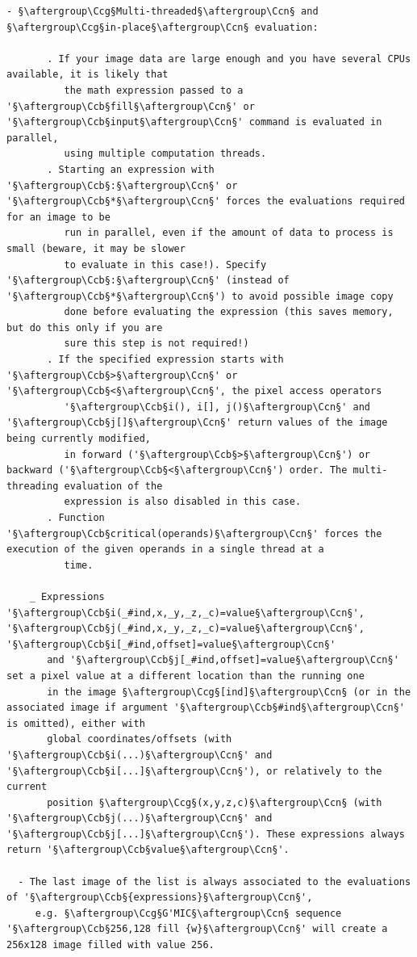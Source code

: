 \documentclass[a4paper,10.5pt,twoside]{book}
\def\Ccb{\color{cb}}
\def\Ccg{\color{cc}}
\def\Ccn{\color{black}}
\begin{document}
\begin{lstlisting}[escapechar=§]
    - §\aftergroup\Ccg§Multi-threaded§\aftergroup\Ccn§ and §\aftergroup\Ccg§in-place§\aftergroup\Ccn§ evaluation: 
 
       . If your image data are large enough and you have several CPUs available, it is likely that 
          the math expression passed to a '§\aftergroup\Ccb§fill§\aftergroup\Ccn§' or '§\aftergroup\Ccb§input§\aftergroup\Ccn§' command is evaluated in parallel, 
          using multiple computation threads. 
       . Starting an expression with '§\aftergroup\Ccb§:§\aftergroup\Ccn§' or '§\aftergroup\Ccb§*§\aftergroup\Ccn§' forces the evaluations required for an image to be 
          run in parallel, even if the amount of data to process is small (beware, it may be slower 
          to evaluate in this case!). Specify '§\aftergroup\Ccb§:§\aftergroup\Ccn§' (instead of '§\aftergroup\Ccb§*§\aftergroup\Ccn§') to avoid possible image copy 
          done before evaluating the expression (this saves memory, but do this only if you are 
          sure this step is not required!) 
       . If the specified expression starts with '§\aftergroup\Ccb§>§\aftergroup\Ccn§' or '§\aftergroup\Ccb§<§\aftergroup\Ccn§', the pixel access operators 
          '§\aftergroup\Ccb§i(), i[], j()§\aftergroup\Ccn§' and '§\aftergroup\Ccb§j[]§\aftergroup\Ccn§' return values of the image being currently modified, 
          in forward ('§\aftergroup\Ccb§>§\aftergroup\Ccn§') or backward ('§\aftergroup\Ccb§<§\aftergroup\Ccn§') order. The multi-threading evaluation of the 
          expression is also disabled in this case. 
       . Function '§\aftergroup\Ccb§critical(operands)§\aftergroup\Ccn§' forces the execution of the given operands in a single thread at a 
          time. 
 
    _ Expressions '§\aftergroup\Ccb§i(_#ind,x,_y,_z,_c)=value§\aftergroup\Ccn§', '§\aftergroup\Ccb§j(_#ind,x,_y,_z,_c)=value§\aftergroup\Ccn§', '§\aftergroup\Ccb§i[_#ind,offset]=value§\aftergroup\Ccn§' 
       and '§\aftergroup\Ccb§j[_#ind,offset]=value§\aftergroup\Ccn§' set a pixel value at a different location than the running one 
       in the image §\aftergroup\Ccg§[ind]§\aftergroup\Ccn§ (or in the associated image if argument '§\aftergroup\Ccb§#ind§\aftergroup\Ccn§' is omitted), either with 
       global coordinates/offsets (with '§\aftergroup\Ccb§i(...)§\aftergroup\Ccn§' and '§\aftergroup\Ccb§i[...]§\aftergroup\Ccn§'), or relatively to the current 
       position §\aftergroup\Ccg§(x,y,z,c)§\aftergroup\Ccn§ (with '§\aftergroup\Ccb§j(...)§\aftergroup\Ccn§' and '§\aftergroup\Ccb§j[...]§\aftergroup\Ccn§'). These expressions always return '§\aftergroup\Ccb§value§\aftergroup\Ccn§'. 
 
  - The last image of the list is always associated to the evaluations of '§\aftergroup\Ccb§{expressions}§\aftergroup\Ccn§', 
     e.g. §\aftergroup\Ccg§G'MIC§\aftergroup\Ccn§ sequence '§\aftergroup\Ccb§256,128 fill {w}§\aftergroup\Ccn§' will create a 256x128 image filled with value 256.
\end{lstlisting}
\end{document}
